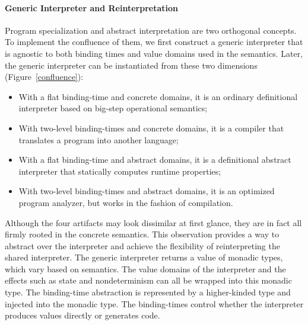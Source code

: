 \paragraph{Generic Interpreter and Reinterpretation}

Program specialization and abstract interpretation are two orthogonal
concepts.  To implement the confluence of them, we first construct a
generic interpreter that is agnostic to both binding times and value
domains used in the semantics.  Later, the generic interpreter can be
instantiated from these two dimensions (Figure~\ref{confluence}):
\begin{itemize}
\item With a flat binding-time and concrete domains, it is an ordinary
  definitional interpreter based on big-step operational semantics;
\item With two-level binding-times and concrete domains, it is a
  compiler that translates a program into another language;
\item With a flat binding-time and abstract domains, it is a
  definitional abstract interpreter \cite{DBLP:journals/pacmpl/DaraisLNH17}
  that statically computes runtime properties;
\item With two-level binding-times and abstract domains, it is an optimized
  program analyzer, but works in the fashion of compilation.
\end{itemize}

Although the four artifacts may look dissimilar at first glance, they are in
fact all firmly rooted in the concrete semantics.  This observation provides a
way to abstract over the interpreter and achieve the flexibility of
reinterpreting the shared interpreter.  The generic interpreter returns a value
of monadic types, which vary based on semantics. The value domains
of the interpreter and the effects such as state and nondeterminism can all be
wrapped into this monadic type.  The binding-time abstraction is represented by
a higher-kinded type and injected into the monadic type.  The binding-times
control whether the interpreter produces values directly or generates code.


